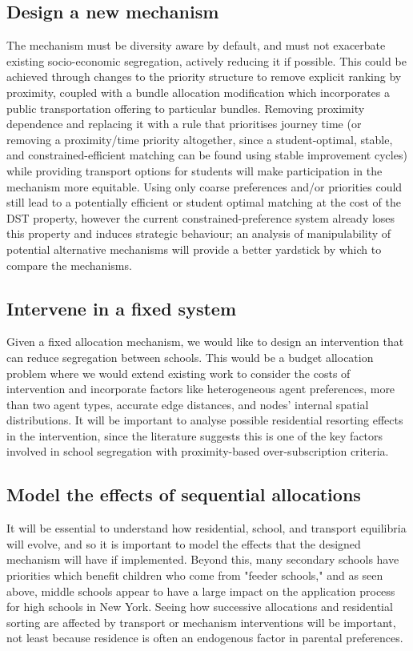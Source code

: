 \documentclass{article}
\begin{document}
\begin{multicols}{2}
\subsection{Design a new mechanism}
The mechanism must be diversity aware by default, and must not exacerbate existing socio-economic segregation, actively reducing it if possible. This could be achieved through changes to the priority structure to remove explicit ranking by proximity, coupled with a bundle allocation modification which incorporates a public transportation offering to particular bundles. Removing proximity dependence and replacing it with a rule that prioritises journey time (or removing a proximity/time priority altogether, since a student-optimal, stable, and constrained-efficient matching can be found using stable improvement cycles) while providing transport options for students will make participation in the mechanism more equitable. Using only coarse preferences and/or priorities could still lead to a potentially efficient or student optimal matching at the cost of the DST property, however the current constrained-preference system already loses this property and induces strategic behaviour; an analysis of manipulability of potential alternative mechanisms will provide a better yardstick by which to compare the mechanisms.

\subsection{Intervene in a fixed system}
Given a fixed allocation mechanism, we would like to design an intervention that can reduce segregation between schools. This would be a budget allocation problem where we would extend existing work to consider the costs of intervention and incorporate factors like heterogeneous agent preferences, more than two agent types, accurate edge distances, and nodes' internal spatial distributions. It will be important to analyse possible residential resorting effects in the intervention, since the literature suggests this is one of the key factors involved in school segregation with proximity-based over-subscription criteria. 

\subsection{Model the effects of sequential allocations}
It will be essential to understand how residential, school, and transport equilibria will evolve, and so it is important to model the effects that the designed mechanism will have if implemented. Beyond this, many secondary schools have priorities which benefit children who come from "feeder schools," and as seen above, middle schools appear to have a large impact on the application process for high schools in New York. Seeing how successive allocations and residential sorting are affected by transport or mechanism interventions will be important, not least because residence is often an endogenous factor in parental preferences.



\end{multicols}
\end{document}
